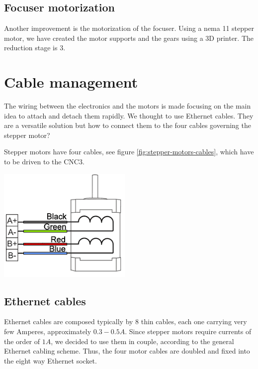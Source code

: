 \documentclass{article}
\begin{document}
\begin{multicols}{2}
        \subsection{Focuser motorization}
        Another improvement is the motorization of the focuser.
        Using a nema 11 stepper motor, we have created the motor supports and the gears using a 3D printer.
        The reduction stage is 3.


        \section{Cable management}
        The wiring between the electronics and the motors is made focusing on the main idea to attach and detach them rapidly.
        We thought to use Ethernet cables.
        They are a versatile solution but how to connect them to the four cables governing the stepper motor?

        Stepper motors have four cables, see figure \ref{fig:stepper-motors-cables}, which have to be driven to the CNC3.
        \\
        \begin{minipage}
            {0.5\textwidth}
            \centering
            \includegraphics[scale=0.5]{stepper-motors-cables.png}
            \label{fig:stepper-motors-cables}
        \end{minipage}

        \subsection{Ethernet cables}
        Ethernet cables are composed typically by 8 thin cables, each one carrying very few Amperes, approximately \(0.3-0.5A\).
        Since stepper motors require currents of the order of \(1A\), we decided to use them in couple, according to the general Ethernet cabling scheme.
        Thus, the four motor cables are doubled and fixed into the eight way Ethernet socket.


\end{multicols}
\end{document}
